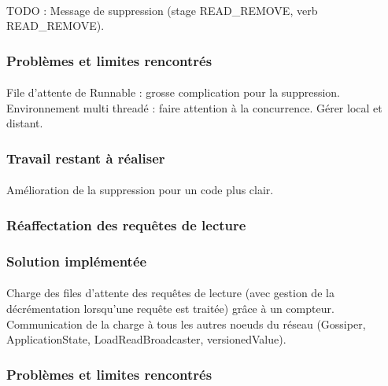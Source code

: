 \documentclass[12pt]{article}
\begin{document}
\paragraph{}TODO : Message de suppression (stage READ\_REMOVE, verb READ\_REMOVE).

\subsubsection*{Problèmes et limites rencontrés}

\paragraph{}File d'attente de Runnable : grosse complication pour la suppression. Environnement multi threadé : faire attention à la concurrence. Gérer local et distant.

\subsubsection*{Travail restant à réaliser}

\paragraph{}Amélioration de la suppression pour un code plus clair.

\subsubsection{Réaffectation des requêtes de lecture}

\subsubsection*{Solution implémentée}

\paragraph{}Charge des files d'attente des requêtes de lecture (avec gestion de la décrémentation lorsqu'une requête est traitée) grâce à un compteur. Communication de la charge à tous les autres noeuds du réseau (Gossiper, ApplicationState, LoadReadBroadcaster, versionedValue).

\subsubsection*{Problèmes et limites rencontrés}
\end{document}
